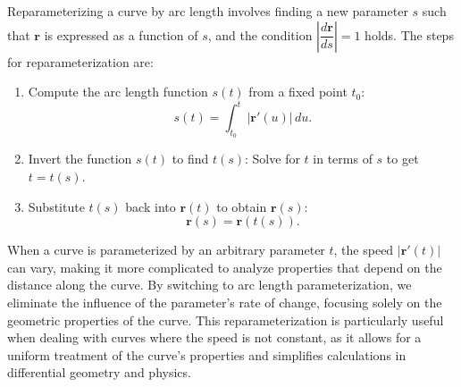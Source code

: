 \noindent Reparameterizing a curve by arc length involves finding a new parameter \( s \) such that \( \mathbf{r} \) is expressed as a function of \( s \), and the condition \( \left| \dfrac{d\mathbf{r}}{ds} \right| = 1 \) holds. The steps for reparameterization are:

\begin{enumerate}
    \item Compute the arc length function \( s(t) \) from a fixed point \( t_0 \):
    \[
    s(t) = \int_{t_0}^{t} \left| \mathbf{r}'(u) \right| \, du.
    \]
    \item Invert the function \( s(t) \) to find \( t(s) \): Solve for \( t \) in terms of \( s \) to get \( t = t(s) \).
    \item Substitute \( t(s) \) back into \( \mathbf{r}(t) \) to obtain \( \mathbf{r}(s) \):
    \[
    \mathbf{r}(s) = \mathbf{r}(t(s)).
    \]
\end{enumerate}

\noindent When a curve is parameterized by an arbitrary parameter \( t \), the speed \( \left| \mathbf{r}'(t) \right| \) can vary, making it more complicated to analyze properties that depend on the distance along the curve. By switching to arc length parameterization, we eliminate the influence of the parameter's rate of change, focusing solely on the geometric properties of the curve. This reparameterization is particularly useful when dealing with curves where the speed is not constant, as it allows for a uniform treatment of the curve's properties and simplifies calculations in differential geometry and physics.

